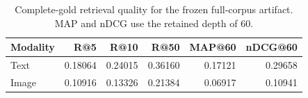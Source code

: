 \begin{table}[H]
\centering
\caption{Complete-gold retrieval quality for the frozen full-corpus artifact. MAP and nDCG use the retained depth of 60.}
\label{tab:full-corpus-retrieval}
\small
\setlength{\tabcolsep}{3.5pt}
\begin{tabular}{@{}lrrrrr@{}}
\toprule
Modality & R@5 & R@10 & R@50 & MAP@60 & nDCG@60 \\
\midrule
Text & 0.18064 & 0.24015 & 0.36160 & 0.17121 & 0.29658 \\
Image & 0.10916 & 0.13326 & 0.21384 & 0.06917 & 0.10941 \\
\bottomrule
\end{tabular}
\end{table}
